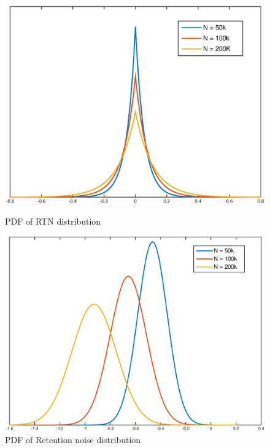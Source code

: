 \documentclass[11pt]{article}
\numberwithin{equation}{subsection}
\begin{document}
\begin{figure}[h]
\centering
{}
\centering
\includegraphics[scale=0.42]{RTN_graph}
\caption{PDF of RTN distribution}
\label{figure:RTN_graph}
\endminipage\hfill
{}
\centering
\includegraphics[scale=0.378]{retention_noise_graph}
\caption{PDF of Retention noise distribution}
\label{figure:ret_graph}
\endminipage
\end{figure}
\end{document}
